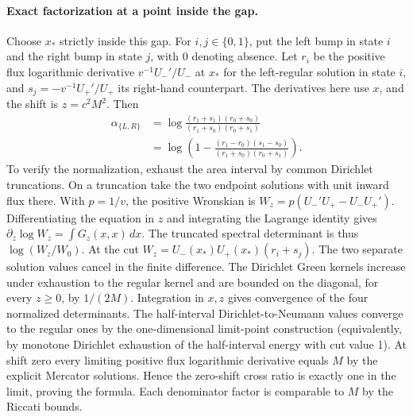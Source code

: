\documentclass[11pt,letterpaper]{article}
\begin{document}
\paragraph{Exact factorization at a point inside the gap.}
Choose \(x_*\) strictly inside this gap. For \(i,j\in\{0,1\}\), put
the left bump in state \(i\) and the right bump in state \(j\), with
0 denoting absence. Let \(r_i\) be the positive flux logarithmic
derivative \(v^{-1}U_-'/U_-\) at \(x_*\) for the left-regular solution
in state \(i\), and \(s_j=-v^{-1}U_+' /U_+\) its right-hand counterpart.
The derivatives here use \(x\), and the shift is \(z=c^2M^2\).
Then
\begin{align*}
 \alpha_{\{L,R\}}
   &=\log\frac{(r_1+s_1)(r_0+s_0)}
                      {(r_1+s_0)(r_0+s_1)}\\
   &=\log\left(1-
       \frac{(r_1-r_0)(s_1-s_0)}{(r_1+s_0)(r_0+s_1)}\right).
\end{align*}
To verify the normalization, exhaust the area interval by common
Dirichlet truncations. On a truncation take the two endpoint solutions
with unit inward flux there. With \(p=1/v\), the positive Wronskian is
\(W_z=p(U_-'U_+-U_-U_+')\). Differentiating the equation in \(z\)
and integrating the Lagrange identity gives
\(\partial_z\log W_z=\int G_z(x,x)\,dx\). The truncated spectral
determinant is thus \(\log(W_z/W_0)\).
At the cut \(W_z=U_-(x_*)U_+(x_*)(r_i+s_j)\). The two separate
solution values cancel in the finite difference. The Dirichlet
Green kernels increase under exhaustion to the regular kernel and
are bounded on the diagonal, for every \(z\geq0\), by \(1/(2M)\).
Integration in \(x,z\) gives convergence of the four normalized
determinants. The half-interval Dirichlet-to-Neumann values converge
to the regular ones by the one-dimensional limit-point construction
(equivalently, by monotone Dirichlet exhaustion of the half-interval
energy with cut value 1). At shift zero every limiting positive
flux logarithmic derivative equals \(M\) by the explicit Mercator
solutions. Hence the zero-shift cross ratio is exactly one in the
limit, proving the formula. Each denominator factor is comparable
to \(M\) by the Riccati bounds.
\end{document}
